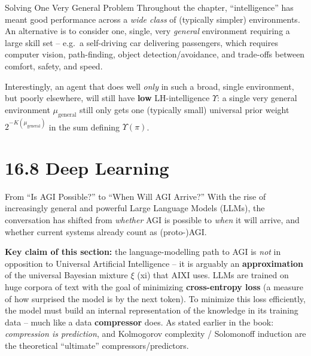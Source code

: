 \documentclass[aspectratio=169,10pt]{beamer}
\begin{document}
\begin{frame}{Solving One Very General Problem}
  Throughout the chapter, ``intelligence'' has meant good performance
  across a \emph{wide class} of (typically simpler) environments. An
  alternative is to consider one, single, very \emph{general}
  environment requiring a large skill set -- e.g.\ a self-driving car
  delivering passengers, which requires computer vision, path-finding,
  object detection/avoidance, and trade-offs between comfort, safety, and
  speed.

  \vspace{0.3em}
  Interestingly, an agent that does well \emph{only} in such a broad, single
  environment, but poorly elsewhere, will still have \textbf{low}
  LH-intelligence $\Upsilon$: a single very general environment
  $\mu_{\text{general}}$ still only gets one (typically small) universal
  prior weight $2^{-K(\mu_{\text{general}})}$ in the sum defining
  $\Upsilon(\pi)$.
\end{frame}

\section{16.8 Deep Learning}

\begin{frame}{From ``Is AGI Possible?'' to ``When Will AGI Arrive?''}
  With the rise of increasingly general and powerful Large Language Models
  (LLMs), the conversation has shifted from \emph{whether} AGI is possible
  to \emph{when} it will arrive, and whether current systems already count
  as (proto-)AGI.

  \vspace{0.3em}
  \textbf{Key claim of this section:} the language-modelling path to AGI is
  \emph{not} in opposition to Universal Artificial Intelligence -- it is
  arguably an \textbf{approximation} of the universal Bayesian mixture
  $\xi$ (xi) that AIXI uses. LLMs are trained on huge corpora of text with
  the goal of minimizing \textbf{cross-entropy loss} (a measure of how
  surprised the model is by the next token). To minimize this loss
  efficiently, the model must build an internal representation of the
  knowledge in its training data -- much like a data \textbf{compressor}
  does. As stated earlier in the book: \emph{compression is prediction},
  and Kolmogorov complexity / Solomonoff induction are the theoretical
  ``ultimate'' compressors/predictors.
\end{frame}
\end{document}
